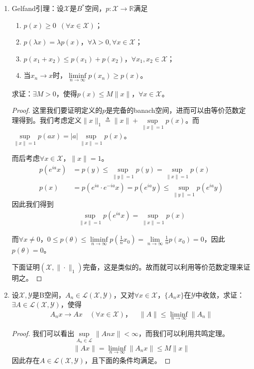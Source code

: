 \begin{enumerate}[leftmargin=2cm, label=\arabic*]
    \item Gelfand引理：设$\mathscr{X}$是$B^*$空间，$p:\mathscr{X}\to\mathbb{R}$满足
    \begin{enumerate}[leftmargin=1cm, label=(\arabic*)]
        \item $p(x)\geqslant 0$\ $(\forall x\in\mathscr{X})$；
        \item $p(\lambda x) = \lambda p(x)$，$\forall \lambda >0,\forall x\in\mathscr{X}$；
        \item $p(x_1+x_2) \leqslant p(x_1) + p(x_2)$，$\forall x_1,x_2\in\mathscr{X}$；
        \item 当$x_n\to x$时，$\liminf\limits_{n\to\infty} p(x_n) \geqslant p(x)$。
    \end{enumerate}
    求证：$\exists M>0$，使得$p(x)\leqslant M\|x\|$，$\forall x\in\mathscr{X}$。
    \begin{proof}
        这里我们要证明定义的$p$是完备的banach空间，进而可以由等价范数定理得到。我们考虑定义$\|x\|_1\triangleq\|x\| + \sup\limits_{\|x\| = 1} p(x)$。而$\sup\limits_{\|x\| = 1} p(ax) = |a| \sup\limits_{\|x\| = 1} p(x)$。

        而后考虑$\forall x\in \mathscr{X}$，$\|x\| =1$。
        \begin{align*}
            p(e^{ia}x) &= p(y) \leqslant \sup\limits_{\|y\| = 1} p(y) = \sup\limits_{\|x\| = 1} p(x) \\
            p(x) &= p(e^{ia} \cdot e^{-ia}x) = p(e^{ia}y) \leqslant \sup\limits_{\|y\| = 1} p(e^{ia}y)
        \end{align*}    
        因此我们得到
        \begin{align*}
            \sup\limits_{\|x\| = 1} p(e^{ia}x) = \sup\limits_{\|x\| = 1} p(x)
        \end{align*}

        而$\forall x\neq 0$，$0\leqslant p(\theta) \leqslant \liminf\limits_{n\to\infty} p(\frac{1}{n}x_0) = \lim\limits_{n\to\infty} \frac{1}{n}p(x_0) = 0 $，因此$p(\theta) = 0$。

        下面证明$(\mathscr{X},\|\cdot\|_1)$完备，这是类似的。故而就可以利用等价范数定理来证明之。
    \end{proof}

    \item 设$\mathscr{X},\mathscr{Y}$是B空间，$A_n\in\mathscr{L}(\mathscr{X},\mathscr{Y})$，又对$\forall x\in\mathscr{X}$，$\{A_nx\}$在$\mathscr{Y}$中收敛，求证：$\exists A\in\mathscr{L}(\mathscr{X},\mathscr{Y})$，使得  
    \begin{align*}
        A_n x\to Ax\quad (\forall x\in\mathscr{X})，\quad \|A\| \leqslant \liminf\limits_{n\to\infty} \|A_n\|
    \end{align*}
    \begin{proof}
        我们可以看出$\sup\limits_{A_n\in \mathscr{L}}\|Anx\|<\infty$，而我们可以利用共鸣定理。
        \begin{align*}
            \|Ax\| = \liminf\limits_{n\to\infty} \|A_nx\| \leqslant M\|x\| 
        \end{align*}
        因此存在$A\in\mathscr{L}(\mathscr{X},\mathscr{Y})$，且下面的条件均满足。
    \end{proof}


\end{enumerate}
